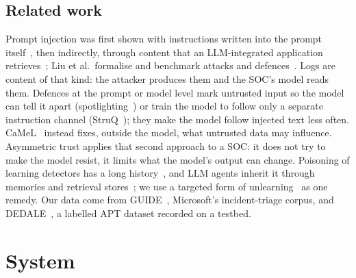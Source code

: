 \documentclass[conference]{IEEEtran}
\begin{document}
\subsection{Related work}
Prompt injection was first shown with instructions written into the prompt itself~\cite{perez}, then indirectly,
through content that an LLM-integrated application retrieves~\cite{greshake}; Liu et al.\ formalise and benchmark
attacks and defences~\cite{liu}. Logs are content of that kind: the attacker produces them and the SOC's model
reads them. Defences at the prompt or model level mark untrusted input so the model can tell it apart
(spotlighting~\cite{spotlighting}) or train the model to follow only a separate instruction channel
(StruQ~\cite{struq}); they make the model follow injected text less often. CaMeL~\cite{camel} instead fixes, outside
the model, what untrusted data may influence. Asymmetric trust applies that second approach to a SOC: it does not
try to make the model resist, it limits what the model's output can change. Poisoning of learning detectors has a
long history~\cite{antidote}, and LLM agents inherit it through memories and retrieval
stores~\cite{agentpoison,poisonedrag}; we use a targeted form of unlearning~\cite{unlearning} as one remedy. Our
data come from GUIDE~\cite{guide}, Microsoft's incident-triage corpus, and DEDALE~\cite{dedale}, a labelled APT
dataset recorded on a testbed.

\section{System}\label{sec:system}
\end{document}
